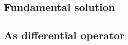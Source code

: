 \subsection{Fundamental solution}

\subsection{As differential operator}
\begin{comment}
  \begin{itemize}
    \item \cite[Sec.4.2]{Loday2014}
  \end{itemize}
\end{comment}

